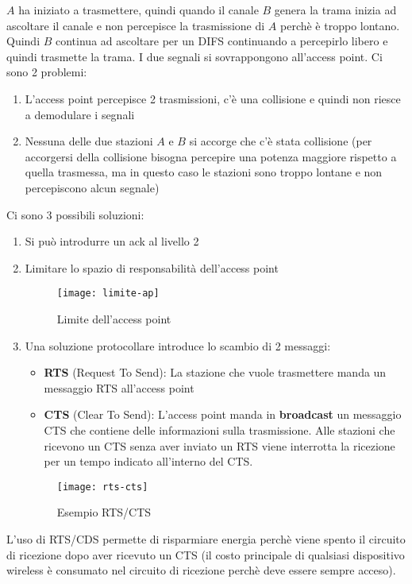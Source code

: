 \documentclass[a4paper]{article}
\begin{document}
\vspace{1em}
\noindent
\( A \) ha iniziato a trasmettere, quindi quando il canale \( B \) genera la trama
inizia ad ascoltare il canale e non percepisce la trasmissione di \( A \) perchè
è troppo lontano. Quindi \( B \) continua ad ascoltare per un DIFS continuando a 
percepirlo libero e quindi trasmette la trama. I due segnali si sovrappongono
all'access point. Ci sono 2 problemi:
\begin{enumerate}
  \item L'access point percepisce 2 trasmissioni, c'è una collisione e quindi non riesce
    a demodulare i segnali
  \item Nessuna delle due stazioni \( A \) e \( B \) si accorge che c'è stata collisione
    (per accorgersi della collisione bisogna percepire una potenza maggiore rispetto
    a quella trasmessa, ma in questo caso le stazioni sono troppo lontane e non
    percepiscono alcun segnale)
\end{enumerate}

\vspace{1em}
\noindent
Ci sono 3 possibili soluzioni:
\begin{enumerate}
  \item Si può introdurre un ack al livello 2
  \item Limitare lo spazio di responsabilità dell'access point
    \begin{figure}[H]
      \centering
      \texttt{[image: limite-ap]}
      \caption{Limite dell'access point}
    \end{figure}
  \item Una soluzione protocollare introduce lo scambio di 2 messaggi:
    \begin{itemize}
      \item \textbf{RTS} (Request To Send): La stazione che vuole trasmettere
        manda un messaggio RTS all'access point
      \item \textbf{CTS} (Clear To Send): L'access point manda in \textbf{broadcast} 
        un messaggio CTS che contiene delle informazioni sulla trasmissione. Alle
        stazioni che ricevono un CTS senza aver inviato un RTS viene interrotta la 
        ricezione per un tempo indicato all'interno del CTS.
    \end{itemize}
    \begin{figure}[H]
      \centering
      \texttt{[image: rts-cts]}
      \caption{Esempio RTS/CTS}
    \end{figure}
\end{enumerate}
L'uso di RTS/CDS permette di risparmiare energia perchè viene spento il circuito di
ricezione dopo aver ricevuto un CTS (il costo principale di qualsiasi dispositivo
wireless è consumato nel circuito di ricezione perchè deve essere sempre acceso).
\end{document}
